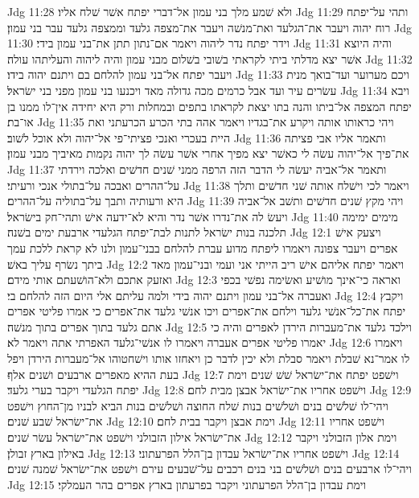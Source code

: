Jdg 11:28  ולא שׁמע מלך בני עמון אל־דברי יפתח אשׁר שׁלח אליו׃
Jdg 11:29  ותהי על־יפתח רוח יהוה ויעבר את־הגלעד ואת־מנשׁה ויעבר את־מצפה גלעד וממצפה גלעד עבר בני עמון׃
Jdg 11:30  וידר יפתח נדר ליהוה ויאמר אם־נתון תתן את־בני עמון בידי׃
Jdg 11:31  והיה היוצא אשׁר יצא מדלתי ביתי לקראתי בשׁובי בשׁלום מבני עמון והיה ליהוה והעליתהו עולה׃
Jdg 11:32  ויעבר יפתח אל־בני עמון להלחם בם ויתנם יהוה בידו׃
Jdg 11:33  ויכם מערוער ועד־בואך מנית עשׂרים עיר ועד אבל כרמים מכה גדולה מאד ויכנעו בני עמון מפני בני ישׂראל׃
Jdg 11:34  ויבא יפתח המצפה אל־ביתו והנה בתו יצאת לקראתו בתפים ובמחלות ורק היא יחידה אין־לו ממנו בן או־בת׃
Jdg 11:35  ויהי כראותו אותה ויקרע את־בגדיו ויאמר אהה בתי הכרע הכרעתני ואת היית בעכרי ואנכי פציתי־פי אל־יהוה ולא אוכל לשׁוב׃
Jdg 11:36  ותאמר אליו אבי פציתה את־פיך אל־יהוה עשׂה לי כאשׁר יצא מפיך אחרי אשׁר עשׂה לך יהוה נקמות מאיביך מבני עמון׃
Jdg 11:37  ותאמר אל־אביה יעשׂה לי הדבר הזה הרפה ממני שׁנים חדשׁים ואלכה וירדתי על־ההרים ואבכה על־בתולי אנכי ורעיתי׃
Jdg 11:38  ויאמר לכי וישׁלח אותה שׁני חדשׁים ותלך היא ורעותיה ותבך על־בתוליה על־ההרים׃
Jdg 11:39  ויהי מקץ שׁנים חדשׁים ותשׁב אל־אביה ויעשׂ לה את־נדרו אשׁר נדר והיא לא־ידעה אישׁ ותהי־חק בישׂראל׃
Jdg 11:40  מימים ימימה תלכנה בנות ישׂראל לתנות לבת־יפתח הגלעדי ארבעת ימים בשׁנה׃
Jdg 12:1  ויצעק אישׁ אפרים ויעבר צפונה ויאמרו ליפתח מדוע עברת להלחם בבני־עמון ולנו לא קראת ללכת עמך ביתך נשׂרף עליך באשׁ׃
Jdg 12:2  ויאמר יפתח אליהם אישׁ ריב הייתי אני ועמי ובני־עמון מאד ואזעק אתכם ולא־הושׁעתם אותי מידם׃
Jdg 12:3  ואראה כי־אינך מושׁיע ואשׂימה נפשׁי בכפי ואעברה אל־בני עמון ויתנם יהוה בידי ולמה עליתם אלי היום הזה להלחם בי׃
Jdg 12:4  ויקבץ יפתח את־כל־אנשׁי גלעד וילחם את־אפרים ויכו אנשׁי גלעד את־אפרים כי אמרו פליטי אפרים אתם גלעד בתוך אפרים בתוך מנשׁה׃
Jdg 12:5  וילכד גלעד את־מעברות הירדן לאפרים והיה כי יאמרו פליטי אפרים אעברה ויאמרו לו אנשׁי־גלעד האפרתי אתה ויאמר לא׃
Jdg 12:6  ויאמרו לו אמר־נא שׁבלת ויאמר סבלת ולא יכין לדבר כן ויאחזו אותו וישׁחטוהו אל־מעברות הירדן ויפל בעת ההיא מאפרים ארבעים ושׁנים אלף׃
Jdg 12:7  וישׁפט יפתח את־ישׂראל שׁשׁ שׁנים וימת יפתח הגלעדי ויקבר בערי גלעד׃
Jdg 12:8  וישׁפט אחריו את־ישׂראל אבצן מבית לחם׃
Jdg 12:9  ויהי־לו שׁלשׁים בנים ושׁלשׁים בנות שׁלח החוצה ושׁלשׁים בנות הביא לבניו מן־החוץ וישׁפט את־ישׂראל שׁבע שׁנים׃
Jdg 12:10  וימת אבצן ויקבר בבית לחם׃
Jdg 12:11  וישׁפט אחריו את־ישׂראל אילון הזבולני וישׁפט את־ישׂראל עשׂר שׁנים׃
Jdg 12:12  וימת אלון הזבולני ויקבר באילון בארץ זבולן׃
Jdg 12:13  וישׁפט אחריו את־ישׂראל עבדון בן־הלל הפרעתוני׃
Jdg 12:14  ויהי־לו ארבעים בנים ושׁלשׁים בני בנים רכבים על־שׁבעים עירם וישׁפט את־ישׂראל שׁמנה שׁנים׃
Jdg 12:15  וימת עבדון בן־הלל הפרעתוני ויקבר בפרעתון בארץ אפרים בהר העמלקי׃
